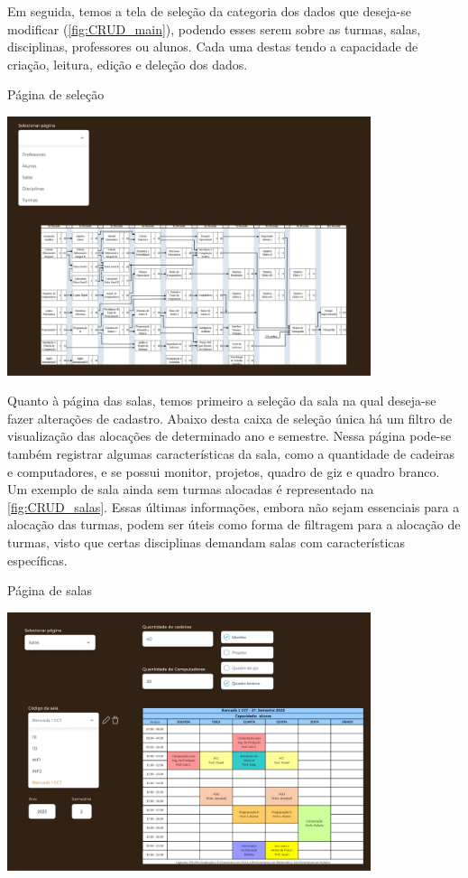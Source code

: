 Em seguida, temos a tela de seleção da categoria dos dados que deseja-se modificar (\autoref{fig:CRUD_main}), podendo esses serem sobre as turmas, salas, disciplinas, professores ou alunos. Cada uma destas tendo a capacidade de criação, leitura, edição e deleção dos dados.

\begin{MyCenteredFigure} \caption{Página de seleção} \label{fig:CRUD_main}
  \includegraphics[width=0.8\textwidth]{files/img/2.02!5-desenvolvimento/2.02!5.1.3-prototipagem/2.02!5.1.3.2-paginas/CRUD_main}
\end{MyCenteredFigure}

Quanto à página das salas, temos primeiro a seleção da sala na qual deseja-se fazer alterações de cadastro. Abaixo desta caixa de seleção única há um filtro de visualização das alocações de determinado ano e semestre. Nessa página pode-se também registrar algumas características da sala, como a quantidade de cadeiras e computadores, e se possui monitor, projetos, quadro de giz e quadro branco. Um exemplo de sala ainda sem turmas alocadas é representado na \autoref{fig:CRUD_salas}. Essas últimas informações, embora não sejam essenciais para a alocação das turmas, podem ser úteis como forma de filtragem para a alocação de turmas, visto que certas disciplinas demandam salas com características específicas.

\begin{MyCenteredFigure} \caption{Página de salas} \label{fig:CRUD_salas}
  \includegraphics[width=0.8\textwidth]{files/img/2.02!5-desenvolvimento/2.02!5.1.3-prototipagem/2.02!5.1.3.2-paginas/crud_salas}
\end{MyCenteredFigure}

